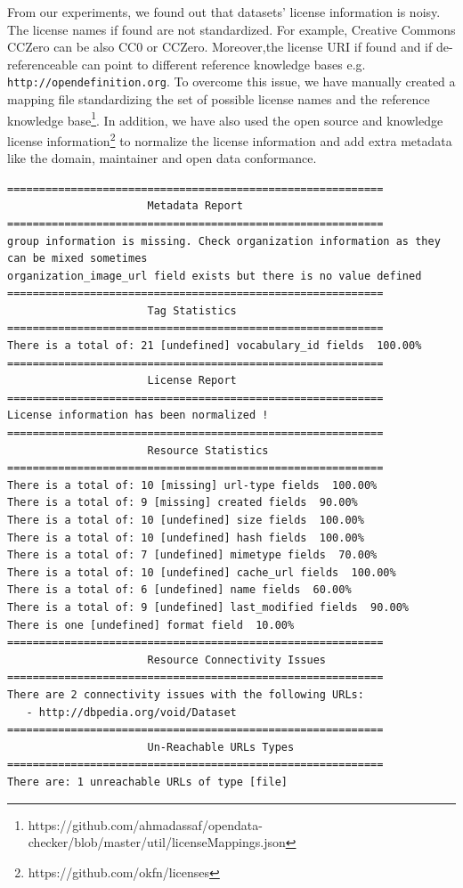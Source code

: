 \documentclass{sig-alternate}
\begin{document}
From our experiments, we found out that datasets' license information is noisy. The license names if found are not standardized. For example, Creative Commons CCZero can be also CC0 or CCZero. Moreover,the license URI if found and if de-referenceable can point to different reference knowledge bases e.g. \texttt{http://opendefinition.org}. To overcome this issue, we have manually created a mapping file standardizing the set of possible license names and the reference knowledge base\footnote{https://github.com/ahmadassaf/opendata-checker/blob/master/util/licenseMappings.json}. In addition, we have also used the open source and knowledge license information\footnote{https://github.com/okfn/licenses} to normalize the license information and add extra metadata like the domain, maintainer and open data conformance.

\begin{lstlisting}
===========================================================
                      Metadata Report
===========================================================
group information is missing. Check organization information as they can be mixed sometimes
organization_image_url field exists but there is no value defined
===========================================================
                      Tag Statistics
===========================================================
There is a total of: 21 [undefined] vocabulary_id fields  100.00%
===========================================================
                      License Report
===========================================================
License information has been normalized !
===========================================================
                      Resource Statistics
===========================================================
There is a total of: 10 [missing] url-type fields  100.00%
There is a total of: 9 [missing] created fields  90.00%
There is a total of: 10 [undefined] size fields  100.00%
There is a total of: 10 [undefined] hash fields  100.00%
There is a total of: 7 [undefined] mimetype fields  70.00%
There is a total of: 10 [undefined] cache_url fields  100.00%
There is a total of: 6 [undefined] name fields  60.00%
There is a total of: 9 [undefined] last_modified fields  90.00%
There is one [undefined] format field  10.00%
===========================================================
                      Resource Connectivity Issues
===========================================================
There are 2 connectivity issues with the following URLs:
   - http://dbpedia.org/void/Dataset
===========================================================
                      Un-Reachable URLs Types
===========================================================
There are: 1 unreachable URLs of type [file]
\end{lstlisting}
\end{document}
